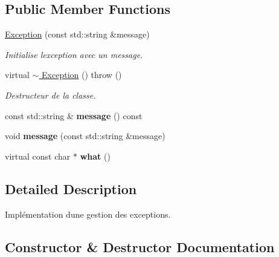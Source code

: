 \subsection*{Public Member Functions}
\begin{DoxyCompactItemize}
\item 
\hyperlink{classlogs_1_1Exception_a0870a395ac3d8d26214b3fa12ed162dc}{Exception} (const std\+::string \&message)
\begin{DoxyCompactList}\small\item\em Initialise l\textquotesingle{}exception avec un message. \end{DoxyCompactList}\item 
\mbox{\label{classlogs_1_1Exception_a73cde7dbec834f929c4c18a58fa011c4}} 
virtual \hyperlink{classlogs_1_1Exception_a73cde7dbec834f929c4c18a58fa011c4}{$\sim$ Exception} ()  throw ()
\begin{DoxyCompactList}\small\item\em Destructeur de la classe. \end{DoxyCompactList}\item 
\mbox{\label{classlogs_1_1Exception_a22795e1ee457539f33c3cec8d22cf890}} 
const std\+::string \& {\bfseries message} () const
\item 
\mbox{\label{classlogs_1_1Exception_a20eeb08301fc02866e2ab24ddd4735f1}} 
void {\bfseries message} (const std\+::string \&message)
\item 
\mbox{\label{classlogs_1_1Exception_a5469d6aa72cc6fe019eae6448880e423}} 
virtual const char $\ast$ {\bfseries what} ()
\end{DoxyCompactItemize}


\subsection{Detailed Description}
Implémentation d\textquotesingle{}une gestion des exceptions. 

\subsection{Constructor \& Destructor Documentation}
\mbox{\label{classlogs_1_1Exception_a0870a395ac3d8d26214b3fa12ed162dc}} 

